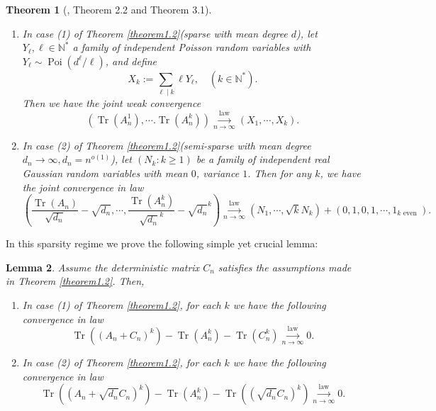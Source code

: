 \documentclass[12pt, reqno]{amsart}
\newtheorem{theorem}{Theorem}[section]
\newtheorem{lemma}[theorem]{Lemma}
\theoremstyle{definition}
\theoremstyle{remark}
\numberwithin{equation}{section}
\begin{document}
\begin{theorem}[\cite{coste2023sparse}, Theorem 2.2 and Theorem 3.1] 
\begin{enumerate} The random matrix $A_n$ in the definition of Theorem \ref{theorem1.2} satisfies the following trace asymptotic:
\item In case (1) of Theorem \ref{theorem1.2}(sparse with mean degree $d$), let $Y_\ell,\ell\in\mathbb{N}^*$ a family of independent Poisson random variables with $Y_\ell\sim \operatorname{Poi}(d^\ell/\ell)$, and define 
\begin{equation}
    X_k:=\sum_{\ell\mid k}\ell Y_\ell,\quad (k\in\mathbb{N}^*).
\end{equation} Then we have the joint weak convergence 
\begin{equation}
    (\operatorname{Tr}(A_n^1),\cdots.\operatorname{Tr}(A_n^k))\overset{\text{law}}{\underset{n\to\infty}\longrightarrow}      (X_1,\cdots,X_k).
\end{equation}

\item In case (2) of Theorem \ref{theorem1.2}(semi-sparse with mean degree $d_n\to\infty,d_n=n^{o(1)}$), let $(N_k:k\geq 1)$ be a family of independent real Gaussian random variables with mean $0$, variance $1$. Then for any $k$, we have the joint convergence in law
\begin{equation}
    \left(\frac{\operatorname{Tr}(A_n)}{\sqrt{d_n}}-\sqrt{d_n},\cdots, \frac{\operatorname{Tr}(A_n^k)}{\sqrt{d_n}^k}-\sqrt{d_n}^k  \right)
    \overset{\text{law}}{\underset{n\to\infty}\longrightarrow}      (N_1,\cdots,\sqrt{k}N_k)+(0,1,0,1,\cdots ,1_{k\text{ even }}).
\end{equation}

\end{enumerate}    
\end{theorem}

In this sparsity regime we prove the following simple yet crucial lemma:

\begin{lemma}\label{lemma438} Assume the deterministic matrix $C_n$ satisfies the assumptions made in Theorem \ref{theorem1.2}. Then,
    \begin{enumerate}
        \item In case (1) of Theorem \ref{theorem1.2}, for each $k$ we have the following convergence in law
        \begin{equation}\label{fucg}
            \operatorname{Tr}((A_n+C_n)^k)-\operatorname{Tr}(A_n^k)-\operatorname{Tr}(C_n^k)    \overset{\text{law}}{\underset{n\to\infty}\longrightarrow} 0.
        \end{equation}
        \item In case (2) of Theorem \ref{theorem1.2}, for each $k$ we have the following convergence in law
        \begin{equation}\label{fucg2}
            \operatorname{Tr}((A_n+\sqrt{d_n}C_n)^k)-\operatorname{Tr}(A_n^k)-\operatorname{Tr}((\sqrt{d_n}C_n)^k)    \overset{\text{law}}{\underset{n\to\infty}\longrightarrow} 0.\end{equation}
    \end{enumerate}
\end{lemma}
\end{document}
